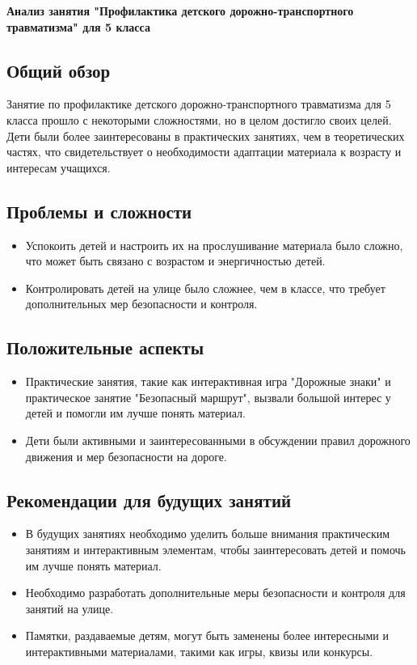 \documentclass[a4paper,12pt]{article}
\begin{document}
\begin{center}
    \large{\textbf{Анализ занятия "Профилактика детского дорожно-транспортного травматизма" для 5 класса}}
\end{center}

\subsection*{Общий обзор}

Занятие по профилактике детского дорожно-транспортного травматизма для 5 класса прошло с некоторыми сложностями, но в целом достигло своих целей. Дети были более заинтересованы в практических занятиях, чем в теоретических частях, что свидетельствует о необходимости адаптации материала к возрасту и интересам учащихся.

\subsection*{Проблемы и сложности}

\begin{itemize}
    \item Успокоить детей и настроить их на прослушивание материала было сложно, что может быть связано с возрастом и энергичностью детей.
    \item Контролировать детей на улице было сложнее, чем в классе, что требует дополнительных мер безопасности и контроля.
\end{itemize}

\subsection*{Положительные аспекты}

\begin{itemize}
    \item Практические занятия, такие как интерактивная игра "Дорожные знаки" и практическое занятие "Безопасный маршрут", вызвали большой интерес у детей и помогли им лучше понять материал.
    \item Дети были активными и заинтересованными в обсуждении правил дорожного движения и мер безопасности на дороге.
\end{itemize}

\subsection*{Рекомендации для будущих занятий}

\begin{itemize}
    \item В будущих занятиях необходимо уделить больше внимания практическим занятиям и интерактивным элементам, чтобы заинтересовать детей и помочь им лучше понять материал.
    \item Необходимо разработать дополнительные меры безопасности и контроля для занятий на улице.
    \item Памятки, раздаваемые детям, могут быть заменены более интересными и интерактивными материалами, такими как игры, квизы или конкурсы.
\end{itemize}
\end{document}

